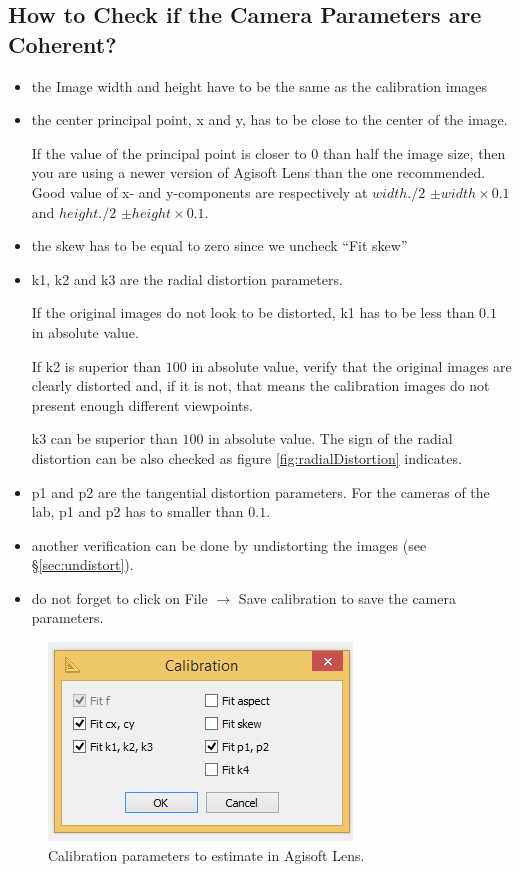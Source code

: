 \documentclass[11pt]{article}
\begin{document}
\subsection{How to Check if the Camera Parameters are Coherent?}
\label{sec:coherentParams}
\begin{itemize}
\item the Image width and height have to be the same as the calibration images
\item the center principal point, x and y, has to be close to the center of the image.

If the value of the principal point is closer to $0$ than half the image size, then you are using a newer version of Agisoft Lens than the one recommended.
Good value of x- and y-components are respectively at $width./2$ $\pm width \times 0.1$  and $height./2$ $\pm height \times 0.1$.
\item the skew has to be equal to zero since we uncheck ``Fit skew''
\item k1, k2 and k3 are the radial distortion parameters.

If the original images do not look to be distorted, k1 has to be less than $0.1$ in absolute value.

If k2 is superior than $100$ in absolute value, verify that the original images are clearly distorted and, if it is not, that means the calibration images do not present enough different viewpoints.

k3 can be superior than $100$ in absolute value. The sign of the radial distortion can be also checked as figure \ref{fig:radialDistortion} indicates.
\item p1 and p2 are the tangential distortion parameters. For the cameras of the lab, p1 and p2 has to smaller than $0.1$.
\item another verification can be done by undistorting the images (see \S\ref{sec:undistort}).
\item do not forget to click on File $\rightarrow$ Save calibration to save the camera parameters.
\end{itemize}

 \begin{figure}[h]
 	\begin{center}
 		\includegraphics[width=7 cm]{images/calibParamsToSelect.png}
 	\end{center}
 	\caption{Calibration parameters to estimate in Agisoft Lens.}
 	\label{fig:calibParamsToEstimate}
 \end{figure}
\end{document}

